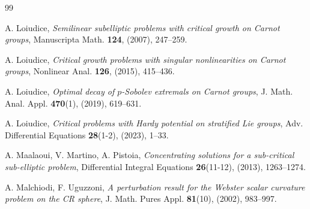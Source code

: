 \documentclass[11pt]{amsart}
\numberwithin{equation}{section} %
\theoremstyle{definition}
\begin{document}
\begin{thebibliography}{99}
	
	
	A. Loiudice,
	{\em Semilinear subelliptic problems with critical growth
		on Carnot groups}, Manuscripta Math. {\bf 124}, (2007), 247--259.
	
	
	A. Loiudice,
	{\em Critical growth problems with singular nonlinearities on Carnot groups},
	Nonlinear Anal. {\bf 126}, (2015), 415--436.
	
	A. Loiudice,
	{\em Optimal decay of $p$-Sobolev extremals on Carnot groups},
	J. Math. Anal. Appl. {\bf 470}(1), (2019), 619--631.
	
	A. Loiudice,
	{\em Critical problems with Hardy potential on stratified Lie groups},
	Adv. Differential Equations {\bf 28}(1-2), (2023), 1--33.
	
	
	
	
	A. Maalaoui, V. Martino, A. Pistoia, 
	{\em Concentrating solutions for a sub-critical sub-elliptic problem},
	Differential Integral Equations {\bf 26}(11-12), (2013), 1263--1274.	
%	
	
	A. Malchiodi, F. Uguzzoni, 
	{\em A perturbation result for the Webster scalar curvature problem on the CR sphere},
	J. Math. Pures Appl. {\bf 81}(10), (2002), 983--997.
	

\end{thebibliography}
\end{document}
